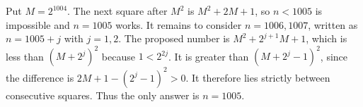 Put $M=2^{1004}$. The next square after $M^2$ is $M^2+2M+1$, so $n<1005$ is impossible and $n=1005$ works. It remains to consider $n=1006,1007$, written as $n=1005+j$ with $j=1,2$. The proposed number is $M^2+2^{j+1}M+1$, which is less than $(M+2^j)^2$ because $1<2^{2j}$. It is greater than $(M+2^j-1)^2$, since the difference is $2M+1-(2^j-1)^2>0$. It therefore lies strictly between consecutive squares. Thus the only answer is $\boxed{n=1005}$.
